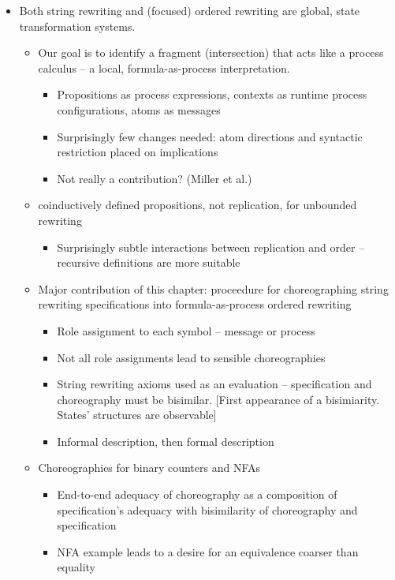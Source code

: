 \begin{itemize}
\item 
  Both string rewriting and (focused) ordered rewriting are global, state transformation systems.
  \begin{itemize}[nosep]
  \item Our goal is to identify a fragment (intersection) that acts like a process calculus -- a local, formula-as-process interpretation.
    \begin{itemize}[nosep]
    \item Propositions as process expressions, contexts as runtime process configurations, atoms as messages 
    \item Surprisingly few changes needed: atom directions and syntactic restriction placed on implications
    \item Not really a contribution?  (Miller et al.)
    \end{itemize}
  \item coinductively defined propositions, not replication, for unbounded rewriting 
 \begin{itemize}[nosep]
    \item Surprisingly subtle interactions between replication and order -- recursive definitions are more suitable 
    \end{itemize}
  \item Major contribution of this chapter: proceedure for choreographing string rewriting specifications into formula-as-process ordered rewriting
    \begin{itemize}[nosep]
    \item Role assignment to each symbol -- message or process
    \item Not all role assignments lead to sensible choreographies
    \item String rewriting axioms used as an evaluation -- specification and choreography must be bisimilar.
      [First appearance of a bisimiarity.  States' structures are observable]
    \item Informal description, then formal description 
    \end{itemize}
  \item Choreographies for binary counters and NFAs 
    \begin{itemize}[nosep]
    \item End-to-end adequacy of choreography as a composition of specification's adequacy with bisimilarity of choreography and specification
    \item NFA example leads to a desire for an equivalence coarser than equality 
    \end{itemize}
  \end{itemize}


\end{itemize}
